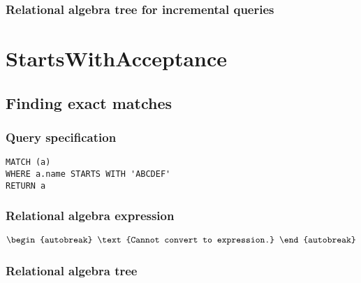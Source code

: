 \subsubsection*{Relational algebra tree for incremental queries}

\section{StartsWithAcceptance}


\subsection{Finding exact matches}

\subsubsection*{Query specification}

\begin{lstlisting}
MATCH (a)
WHERE a.name STARTS WITH 'ABCDEF'
RETURN a
\end{lstlisting}

\subsubsection*{Relational algebra expression}

\begin{align*}
\begin{autobreak}
\text{Cannot convert to expression.}
\end{autobreak}
\end{align*}

\subsubsection*{Relational algebra tree}


